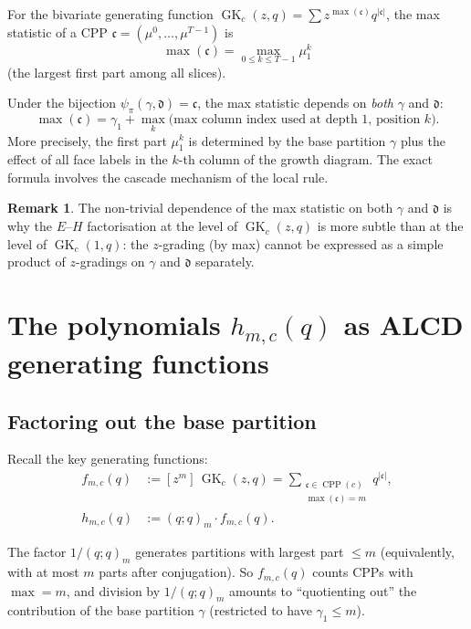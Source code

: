 \documentclass[11pt]{article}
\newcommand{\GK}{\operatorname{GK}}
\newcommand{\CPP}{\operatorname{CPP}}
\newcommand{\qpochn}[3]{(#1;#2)_{#3}}
\theoremstyle{plain}
\theoremstyle{definition}
\newtheorem{remark}[theorem]{Remark}
\begin{document}
For the bivariate generating function $\GK_c(z,q) = \sum z^{\max(\mathfrak{c})} q^{|\mathfrak{c}|}$, the max statistic of a CPP
$\mathfrak{c} = (\mu^0, \ldots, \mu^{T-1})$ is
\[
  \max(\mathfrak{c}) = \max_{0 \leq k \leq T-1} \mu^k_1
\]
(the largest first part among all slices).

Under the bijection $\psi_\pi(\gamma, \mathfrak{d}) = \mathfrak{c}$,
the max statistic depends on \emph{both} $\gamma$ and $\mathfrak{d}$:
\[
  \max(\mathfrak{c}) = \gamma_1 + \max_{k} \bigl(\text{max column index
  used at depth~1, position~$k$}\bigr).
\]
More precisely, the first part $\mu^k_1$ is determined by the base
partition $\gamma$ plus the effect of all face labels in the $k$-th
column of the growth diagram.  The exact formula involves the cascade
mechanism of the local rule.

\begin{remark}
The non-trivial dependence of the max statistic on both $\gamma$ and
$\mathfrak{d}$ is why the $E$--$H$ factorisation at the level of
$\GK_c(z,q)$ is more subtle than at the level of $\GK_c(1,q)$: the
$z$-grading (by max) cannot be expressed as a simple product of
$z$-gradings on $\gamma$ and $\mathfrak{d}$ separately.
\end{remark}


\section{The polynomials $h_{m,c}(q)$ as ALCD generating functions}
\label{sec:hmc}

\subsection{Factoring out the base partition}

Recall the key generating functions:
\begin{align}
  f_{m,c}(q) &:= [z^m]\,\GK_c(z,q)
    = \sum_{\substack{\mathfrak{c} \in \CPP(c) \\ \max(\mathfrak{c}) = m}}
      q^{|\mathfrak{c}|},
    \label{eq:fmc} \\
  h_{m,c}(q) &:= \qpochn{q}{q}{m} \cdot f_{m,c}(q).
    \label{eq:hmc}
\end{align}

The factor $1/\qpochn{q}{q}{m}$ generates partitions with largest part
$\leq m$ (equivalently, with at most $m$ parts after conjugation).
So $f_{m,c}(q)$ counts CPPs with $\max = m$, and division by
$1/\qpochn{q}{q}{m}$ amounts to ``quotienting out'' the contribution of
the base partition $\gamma$ (restricted to have $\gamma_1 \leq m$).
\end{document}
